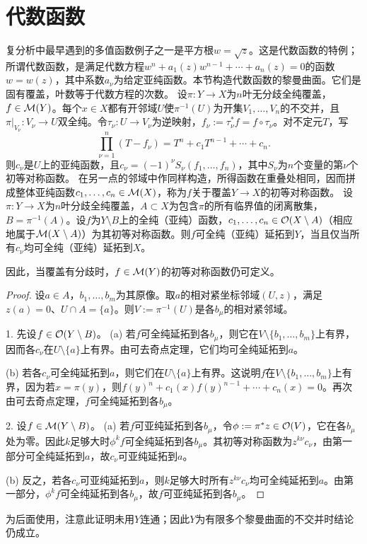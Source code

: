 \section{代数函数}
复分析中最早遇到的多值函数例子之一是平方根$w=\sqrt z$。这是代数函数的特例；所谓代数函数，是满足代数方程$w^n+a_1(z)w^{n-1}+\cdots+a_n(z)=0$的函数$w=w(z)$，其中系数$a_\nu$为给定亚纯函数。本节构造代数函数的黎曼曲面。它们是固有覆盖，叶数等于代数方程的次数。
设$\pi:Y\to X$为$n$叶无分歧全纯覆盖，$f\in\mathcal M(Y)$。每个$x\in X$都有开邻域$U$使$\pi^{-1}(U)$为开集$V_1,\ldots,V_n$的不交并，且$\pi|_{V_\nu}:V_\nu\to U$双全纯。令$\tau_\nu:U\to V_\nu$为逆映射，$f_\nu:=\tau_\nu^*f=f\circ\tau_\nu$。对不定元$T$，写
\[
\prod_{\nu=1}^n(T-f_\nu)=T^n+c_1T^{n-1}+\cdots+c_n.
\]
则$c_\nu$是$U$上的亚纯函数，且$c_\nu=(-1)^\nu S_\nu(f_1,\ldots,f_n)$，其中$S_\nu$为$n$个变量的第$\nu$个初等对称函数。
在另一点的邻域中作同样构造，所得函数在重叠处相同，因而拼成整体亚纯函数$c_1,\ldots,c_n\in\mathcal M(X)$，称为$f$关于覆盖$Y\to X$的初等对称函数。
设$\pi:Y\to X$为$n$叶分歧全纯覆盖，$A\subset X$为包含$\pi$的所有临界值的闭离散集，$B=\pi^{-1}(A)$。设$f$为$Y\setminus B$上的全纯（亚纯）函数，$c_1,\ldots,c_n\in\mathcal O(X\setminus A)$（相应地属于$\mathcal M(X\setminus A)$）为其初等对称函数。则$f$可全纯（亚纯）延拓到$Y$，当且仅当所有$c_\nu$均可全纯（亚纯）延拓到$X$。

因此，当覆盖有分歧时，$f\in\mathcal M(Y)$的初等对称函数仍可定义。
\begin{proof}
设$a\in A$，$b_1,\ldots,b_m$为其原像。取$a$的相对紧坐标邻域$(U,z)$，满足$z(a)=0$、$U\cap A=\{a\}$。则$V:=\pi^{-1}(U)$是各$b_\mu$的相对紧邻域。

1. 先设$f\in\mathcal O(Y\setminus B)$。
(a) 若$f$可全纯延拓到各$b_\mu$，则它在$V\setminus\{b_1,\ldots,b_m\}$上有界，因而各$c_\nu$在$U\setminus\{a\}$上有界。由可去奇点定理，它们均可全纯延拓到$a$。

(b) 若各$c_\nu$可全纯延拓到$a$，则它们在$U\setminus\{a\}$上有界。这说明$f$在$V\setminus\{b_1,\ldots,b_m\}$上有界，因为若$x=\pi(y)$，则$f(y)^n+c_1(x)f(y)^{n-1}+\cdots+c_n(x)=0$。再次由可去奇点定理，$f$可全纯延拓到各$b_\mu$。

2. 设$f\in\mathcal M(Y\setminus B)$。
(a) 若$f$可亚纯延拓到各$b_\mu$，令$\phi:=\pi^*z\in\mathcal O(V)$，它在各$b_\mu$处为零。因此$k$足够大时$\phi^kf$可全纯延拓到各$b_\mu$。其初等对称函数为$z^{k\nu}c_\nu$，由第一部分可全纯延拓到$a$，故$c_\nu$可亚纯延拓到$a$。

(b) 反之，若各$c_\nu$可亚纯延拓到$a$，则$k$足够大时所有$z^{k\nu}c_\nu$均可全纯延拓到$a$。由第一部分，$\phi^kf$可全纯延拓到各$b_\mu$，故$f$可亚纯延拓到各$b_\mu$。
\end{proof}
为后面使用，注意此证明未用$Y$连通；因此$Y$为有限多个黎曼曲面的不交并时结论仍成立。

